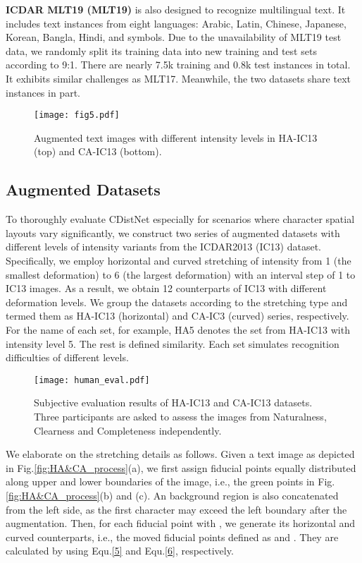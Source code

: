 \noindent\textbf{ICDAR MLT19 (MLT19)} \citep{nayef2019mlt19} is also designed to recognize multilingual text. It includes text instances from eight languages: Arabic, Latin, Chinese, Japanese, Korean, Bangla, Hindi, and symbols. Due to the unavailability of MLT19 test data, we randomly split its training data into new training and test sets according to 9:1. There are nearly 7.5k training and 0.8k test instances in total. It exhibits similar challenges as MLT17. Meanwhile, the two datasets share text instances in part.


\begin{figure*}[t]
\centering
\texttt{[image: fig5.pdf]} \caption{Augmented text images with different intensity levels in HA-IC13 (top) and CA-IC13 (bottom).}
\label{fig5:HA&CA_datasets}
\end{figure*}

\subsection{Augmented Datasets}
To thoroughly evaluate CDistNet especially for scenarios where character spatial layouts vary significantly, we construct two series of augmented datasets with different levels of intensity variants from the ICDAR2013 (IC13) dataset. Specifically, we employ horizontal and curved stretching of intensity from 1 (the smallest deformation) to 6 (the largest deformation) with an interval step of 1 to IC13 images. As a result, we obtain 12 counterparts of IC13 with different deformation levels. We group the datasets according to the stretching type and termed them as HA-IC13 (horizontal) and CA-IC3 (curved) series, respectively. For the name of each set, for example, HA5 denotes the set from HA-IC13 with intensity level 5. The rest is defined similarity. Each set simulates recognition difficulties of different levels. 

\begin{figure*}[]
\centering
\texttt{[image: human\_eval.pdf]} \caption{Subjective evaluation results of HA-IC13 and CA-IC13 datasets. Three participants are asked to assess the images from Naturalness, Clearness and Completeness independently.}
\label{human_eval}
\end{figure*}

We elaborate on the stretching details as follows. Given a text image  as depicted in Fig.\ref{fig:HA&CA_process}(a), we first assign  fiducial points equally distributed along upper and lower boundaries of the image, i.e., the green points in Fig.\ref{fig:HA&CA_process}(b) and (c). An  background region is also concatenated from the left side, as the first character may exceed the left boundary after the augmentation. Then, for each fiducial point  with , we generate its horizontal and curved counterparts, i.e., the moved fiducial points defined as  and . They are calculated by using Equ.\ref{5} and Equ.\ref{6}, respectively.

